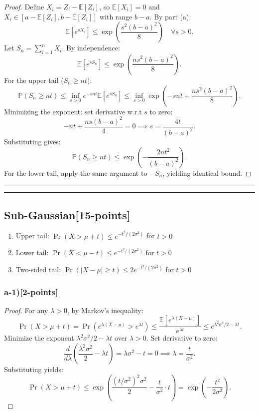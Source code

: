\documentclass[12pt]{article}
\begin{document}
{{\begin{proof}
Define \( X_i = Z_i - \mathbb{E}[Z_i] \), so \( \mathbb{E}[X_i] = 0 \) and \( X_i \in [a - \mathbb{E}[Z_i], b - \mathbb{E}[Z_i]] \) with range \( b - a \). By part (a):
\[
\mathbb{E}[e^{sX_i}] \leq \exp\left( \frac{s^2 (b - a)^2}{8} \right) \quad \forall s > 0.
\]
Let \( S_n = \sum_{i=1}^n X_i \). By independence:
\[
\mathbb{E}[e^{sS_n}] \leq \exp\left( \frac{n s^2 (b - a)^2}{8} \right).
\]
For the upper tail (\( S_n \geq nt \)):
\[
\mathbb{P}(S_n \geq nt) \leq \inf_{s>0} e^{-snt} \mathbb{E}[e^{sS_n}] \leq \inf_{s>0} \exp\left( -snt + \frac{n s^2 (b - a)^2}{8} \right).
\]
Minimizing the exponent: set derivative w.r.t \( s \) to zero:
\[
-nt + \frac{ns(b-a)^2}{4} = 0 \implies s = \frac{4t}{(b-a)^2}.
\]
Substituting gives:
\[
\mathbb{P}(S_n \geq nt) \leq \exp\left( -\frac{2nt^2}{(b-a)^2} \right).
\]
For the lower tail, apply the same argument to \( -S_n \), yielding identical bound.
\end{proof}

\noindent\rule{\textwidth}{0.2pt}
\noindent\rule{\textwidth}{0.2pt}
\subsection{Sub-Gaussian[15-points]}
\begin{enumerate}
    \item[(1)] Upper tail: \( \Pr(X > \mu + t) \leq e^{-t^2/(2\sigma^2)} \) for \( t > 0 \)
    \item[(2)] Lower tail: \( \Pr(X < \mu - t) \leq e^{-t^2/(2\sigma^2)} \) for \( t > 0 \)
    \item[(3)] Two-sided tail: \( \Pr(|X - \mu| \geq t) \leq 2e^{-t^2/(2\sigma^2)} \) for \( t > 0 \)
\end{enumerate}
\subsubsection{a-1)[2-points]}
\begin{proof}
For any \( \lambda > 0 \), by Markov's inequality:
\[
\Pr(X > \mu + t) = \Pr(e^{\lambda(X - \mu)} > e^{\lambda t}) \leq \frac{\mathbb{E}[e^{\lambda(X - \mu)}]}{e^{\lambda t}} \leq e^{\lambda^2\sigma^2/2 - \lambda t}.
\]
Minimize the exponent \( \lambda^2\sigma^2/2 - \lambda t \) over \( \lambda > 0 \). Set derivative to zero:
\[
\frac{d}{d\lambda}\left(\frac{\lambda^2\sigma^2}{2} - \lambda t\right) = \lambda\sigma^2 - t = 0 \implies \lambda = \frac{t}{\sigma^2}.
\]
Substituting yields:
\[
\Pr(X > \mu + t) \leq \exp\left(\frac{(t/\sigma^2)^2\sigma^2}{2} - \frac{t}{\sigma^2} \cdot t\right) = \exp\left(-\frac{t^2}{2\sigma^2}\right).
\]
\end{proof}

}}
\end{document}
